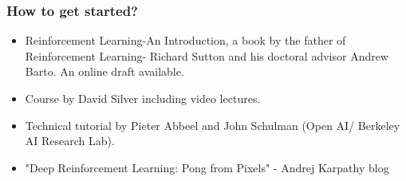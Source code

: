 \begin{frame}[fragile]\frametitle{How to get started?}

\begin{itemize}
\item Reinforcement Learning-An Introduction, a book by the father of Reinforcement Learning- Richard Sutton and his doctoral advisor Andrew Barto. An online draft available.
\item Course by David Silver including video lectures.
\item Technical tutorial by Pieter Abbeel and John Schulman (Open AI/ Berkeley AI Research Lab).
\item "Deep Reinforcement Learning: Pong from Pixels" - Andrej Karpathy blog
\end{itemize}

\end{frame}





